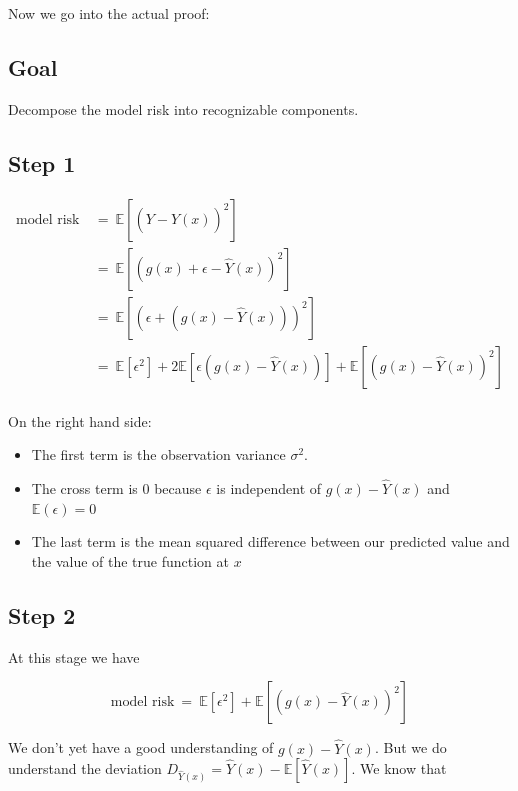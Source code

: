 \documentclass[
  letterpaper,
  DIV=11,
  numbers=noendperiod]{scrreprt}
\providecommand{\tightlist}{%
  \setlength{\itemsep}{0pt}\setlength{\parskip}{0pt}}\usepackage{longtable,booktabs,array}
\begin{document}
\begin{tcolorbox}[enhanced jigsaw, breakable, arc=.35mm, leftrule=.75mm, left=2mm, colframe=quarto-callout-color-frame, rightrule=.15mm, bottomrule=.15mm, toprule=.15mm, opacityback=0, colback=white]
Now we go into the actual proof:

\subsection{Goal}\label{goal}

Decompose the model risk into recognizable components.

\subsection{Step 1}\label{step-1}

\[
\begin{align*}
\text{model risk} ~ &= ~ \mathbb{E}\left[\left(Y - \hat{Y}(x)\right)^2 \right] \\
&= ~ \mathbb{E}\left[\left(g(x) + \epsilon - \hat{Y}(x)\right)^2 \right] \\
&= ~ \mathbb{E}\left[\left(\epsilon + \left(g(x)- \hat{Y}(x)\right)\right)^2 \right] \\
&= ~ \mathbb{E}\left[\epsilon^2\right] + 2\mathbb{E}\left[\epsilon \left(g(x)- \hat{Y}(x)\right)\right] + \mathbb{E}\left[\left(g(x) - \hat{Y}(x)\right)^2\right]\\
\end{align*}
\]

On the right hand side:

\begin{itemize}
\tightlist
\item
  The first term is the observation variance \(\sigma^2\).
\item
  The cross term is 0 because \(\epsilon\) is independent of
  \(g(x) - \hat{Y}(x)\) and \(\mathbb{E}(\epsilon) = 0\)
\item
  The last term is the mean squared difference between our predicted
  value and the value of the true function at \(x\)
\end{itemize}

\subsection{Step 2}\label{step-2}

At this stage we have

\[
\text{model risk} ~ = ~ \mathbb{E}\left[\epsilon^2\right] + \mathbb{E}\left[\left(g(x) - \hat{Y}(x)\right)^2\right]
\]

We don't yet have a good understanding of \(g(x) - \hat{Y}(x)\). But we
do understand the deviation
\(D_{\hat{Y}(x)} = \hat{Y}(x) - \mathbb{E}\left[\hat{Y}(x)\right]\). We
know that


\end{tcolorbox}
\end{document}
